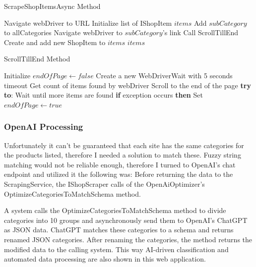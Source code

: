 \begin{algorithm}
	\caption{ScrapeShopItemsAsync Method}
	\begin{algorithmic}
		\State Navigate webDriver to URL
		\State Initialize list of IShopItem $items$
		\State Add $subCategory$ to allCategories
		\State Navigate webDriver to $subCategory$'s link
		\State Call ScrollTillEnd
		\State Create and add new ShopItem to $items$
		\EndFor
		\EndFor
		\EndFor
		\newline
		\Return $items$
	\end{algorithmic}
\end{algorithm}

\begin{algorithm}
	\caption{ScrollTillEnd Method}
	\begin{algorithmic}
		\State Initialize $endOfPage \gets false$
		\State Create a new WebDriverWait with 5 seconds timeout
		\While{not $endOfPage$}
		\State Get count of items found by webDriver
		\State Scroll to the end of the page
		\State \textbf{try to}:
		\State \hspace{\algorithmicindent} Wait until more items are found
		\State \textbf{if} exception occurs \textbf{then}
		\State \hspace{\algorithmicindent} Set $endOfPage \gets true$
		\EndWhile
	\end{algorithmic}
\end{algorithm}

\newpage

\subsubsection{OpenAI Processing}

Unfortunately it can't be guaranteed that each site has the same categories for the products listed, therefore I needed a solution to match these. Fuzzy string matching would not be reliable enough, therefore I turned to OpenAI's chat endpoint and utilized it the following was: Before returning the data to the ScrapingService, the IShopScraper calls of the OpenAiOptimizer's OptimizeCategoriesToMatchSchema method.

A system calls the OptimizeCategoriesToMatchSchema method to divide categories into 10 groups and asynchronously send them to OpenAI's ChatGPT as JSON data. ChatGPT matches these categories to a schema and returns renamed JSON categories. After renaming the categories, the method returns the modified data to the calling system. This way AI-driven classification and automated data processing are also shown in this web application.

